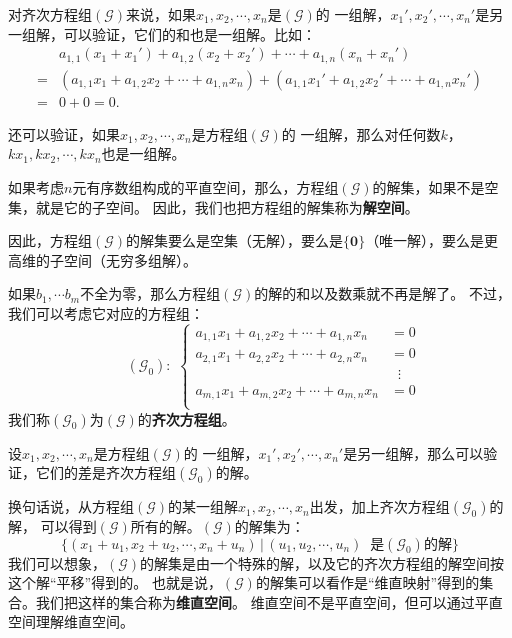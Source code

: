 \documentclass[12pt,UTF8]{ctexbook}
\theoremstyle{definition}
\theoremstyle{plain}
\begin{document}
对齐次方程组$(\mathcal{G})$来说，如果$x_1, x_2, \cdots , x_n$是$(\mathcal{G})$的
一组解，$x_1', x_2', \cdots , x_n'$是另一组解，可以验证，它们的和也是一组解。比如：
\begin{align*}
     & a_{1,1} (x_1 + x_1') + a_{1,2} (x_2 + x_2') + \cdots + a_{1,n} (x_n + x_n') \\
    =& \left(a_{1,1} x_1 + a_{1,2} x_2 + \cdots + a_{1,n} x_n\right) + \left(a_{1,1} x_1' + a_{1,2} x_2' + \cdots + a_{1,n} x_n'\right) \\
    =& 0 + 0 = 0.
\end{align*}

还可以验证，如果$x_1, x_2, \cdots , x_n$是方程组$(\mathcal{G})$的
一组解，那么对任何数$k$，$kx_1, kx_2, \cdots , kx_n$也是一组解。

如果考虑$n$元有序数组构成的平直空间，那么，方程组$(\mathcal{G})$的解集，如果不是空集，就是它的子空间。
因此，我们也把方程组的解集称为\textbf{解空间}。

因此，方程组$(\mathcal{G})$的解集要么是空集（无解），要么是$\{\mathbf{0}\}$（唯一解），要么是更高维的子空间（无穷多组解）。

如果$b_1, \cdots b_m$不全为零，那么方程组$(\mathcal{G})$的解的和以及数乘就不再是解了。
不过，我们可以考虑它对应的方程组：
$$
\qquad (\mathcal{G}_0):\,\,
\left\{
    \begin{aligned}
        a_{1,1} x_1 + a_{1,2} x_2 + \cdots + a_{1,n} x_n &= 0 \\
        a_{2,1} x_1 + a_{2,2} x_2 + \cdots + a_{2,n} x_n &= 0 \\
        &\;\;\vdots \\
        a_{m,1} x_1 + a_{m,2} x_2 + \cdots + a_{m,n} x_n &= 0 \\
    \end{aligned}
\right.
$$
我们称$(\mathcal{G}_0)$为$(\mathcal{G})$的\textbf{齐次方程组}。

设$x_1, x_2, \cdots , x_n$是方程组$(\mathcal{G})$的
一组解，$x_1', x_2', \cdots , x_n'$是另一组解，那么可以验证，它们的差是齐次方程组$(\mathcal{G}_0)$的解。

换句话说，从方程组$(\mathcal{G})$的某一组解$x_1, x_2, \cdots , x_n$出发，加上齐次方程组$(\mathcal{G}_0)$的解，
可以得到$(\mathcal{G})$所有的解。$(\mathcal{G})$的解集为：
$$ \{(x_1+u_1, x_2+u_2, \cdots , x_n+u_n) \, | \, (u_1, u_2, \cdots, u_n) \;\; \mbox{是}(\mathcal{G}_0)\mbox{的解} \} $$
我们可以想象，$(\mathcal{G})$的解集是由一个特殊的解，以及它的齐次方程组的解空间按这个解“平移”得到的。
也就是说，$(\mathcal{G})$的解集可以看作是“维直映射”得到的集合。我们把这样的集合称为\textbf{维直空间}。
维直空间不是平直空间，但可以通过平直空间理解维直空间。
\end{document}
